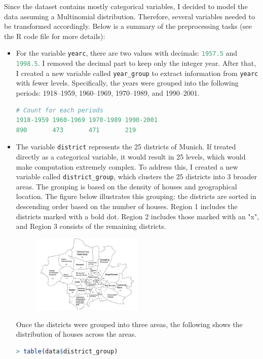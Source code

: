 \documentclass[15pt,a4paper]{report}
\begin{document}
Since the dataset contains mostly categorical variables, I decided to model the data assuming a Multinomial distribution. Therefore, several variables needed to be transformed accordingly. Below is a summary of the preprocessing tasks (see the R code file for more details):
\begin{itemize}
	\item For the variable \lstinline[language=R]|yearc|, there are two values with decimals: \lstinline[language=R]|1957.5| and \lstinline[language=R]|1998.5|. I removed the decimal part to keep only the integer year.	After that, I created a new variable called \lstinline[language=R]|year_group| to extract information from \lstinline[language=R]|yearc| with fewer levels. Specifically, the years were grouped into the following periods: 1918–1959, 1960–1969, 1970–1989, and 1990–2001. 
		\begin{lstlisting}[language=R]
# Count for each periods
1918-1959 1960-1969 1970-1989 1990-2001 
890       473       471       219
	\end{lstlisting}

	
	\item The variable \lstinline[language=R]|district| represents the 25 districts of Munich. If treated directly as a categorical variable, it would result in 25 levels, which would make computation extremely complex.
	To address this, I created a new variable called \lstinline[language=R]|district_group|, which clusters the 25 districts into 3 broader areas. The grouping is based on the density of houses and geographical location. The figure below illustrates this grouping: the districts are sorted in descending order based on the number of houses.	Region 1 includes the districts marked with a bold dot.	Region 2 includes those marked with an "x", and Region 3 consists of the remaining districts.
	\begin{figure}[H]
		\centering \includegraphics[width=0.5\textwidth]{munich_district.jpg}
	\end{figure}
	Once the districts were grouped into three areas, the following shows the distribution of houses across the areas.
			\begin{lstlisting}[language=R]
> table(data$district_group)


\end{lstlisting}
\end{itemize}
\end{document}
